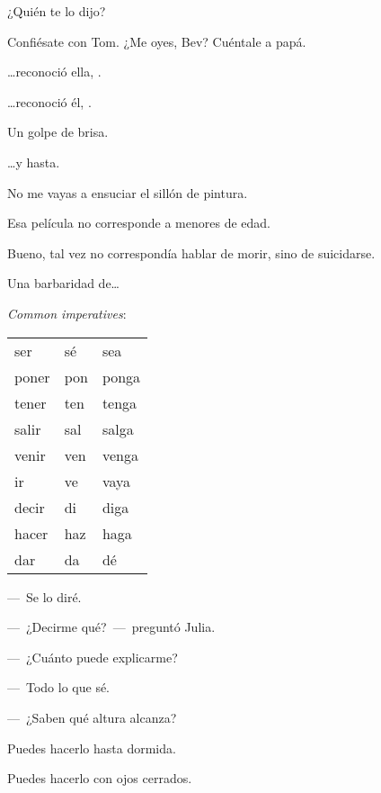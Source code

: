 \sk
¿Quién te lo dijo? 

\sk
Confiésate con Tom. ¿Me oyes, Bev? Cuéntale a papá.

\sk
\ldots{}reconoció ella, . 

\sk
\ldots{}reconoció él, . 

\sk
Un golpe de brisa. 

\sk
\ldots{}y hasta. 

\sk
No me vayas a ensuciar el sillón de pintura. 

\sk
Esa película no corresponde a menores de edad. 

\sk
Bueno, tal vez no correspondía hablar de morir, sino de suicidarse. 

\sk
Una barbaridad de\ldots{} 

\bigskip
\textit{Common imperatives}:

\sk
\begin{tabular}{lll}
    ser   & sé  & sea\\
    poner & pon & ponga\\
    tener & ten & tenga\\
    salir & sal & salga\\
    venir & ven & venga\\
    ir    & ve  & vaya\\
    decir & di  & diga\\
    hacer & haz & haga\\
    dar   & da  & dé\\
\end{tabular}

\bigskip
---~Se lo diré. 

---~¿Decirme qué?~---~preguntó Julia. 

\sk
---~¿Cuánto puede explicarme? 

---~Todo lo que sé. 

\sk
---~¿Saben qué altura alcanza? 

\sk
Puedes hacerlo hasta dormida. 

\sk
Puedes hacerlo con ojos cerrados. 

